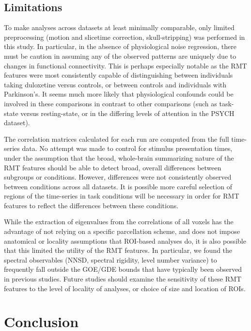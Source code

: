 \documentclass[NETN,manuscript]{stjour-new}
\begin{document}
\subsection{Limitations}

To make analyses across datasets at least minimally comparable, only limited preprocessing (motion
and slicetime correction, skull-stripping) was performed in this study. In particular, in the
absence of physiological noise regression, there must be caution in assuming any of the observed
patterns are uniquely due to changes in functional connectivity. This is perhaps especially notable
as the RMT features were most consistently capable of distinguishing between individuals taking
duloxetine versus controls, or between controls and individuals with Parkinson's. It seems much more
likely that physiological confounds could be involved in these comparisons in contrast to other
comparisons (such as task-state versus resting-state, or in the differing levels of attention in the
PSYCH dataset).

The correlation matrices calculated for each run are computed from the full time-series data. No
attempt was made to control for stimulus presentation times, under the assumption that the broad,
whole-brain summarizing nature of the RMT features should be able to detect broad, overall
differences between subgroups or conditions. However, differences were not consistently observed
between conditions across all datasets. It is possible more careful selection of regions of the
time-series in task conditions will be necessary in order for RMT features to reflect the
differences between these conditions.

While the extraction of eigenvalues from the correlations of all voxels has the advantage of not
relying on a specific parcellation scheme, and does not impose anatomical or locality assumptions
that ROI-based analyses do, it is also possible that this limited the utility of the RMT features.
In particular, we found the spectral observables (NNSD, spectral rigidity, level number variance) to
frequently fall outside the GOE/GDE bounds that have typically been observed in previous studies.
Future studies should examine the sensitivity of these RMT features to the level of locality of
analyses, or choice of size and location of ROIs.

\section{Conclusion}
\end{document}
